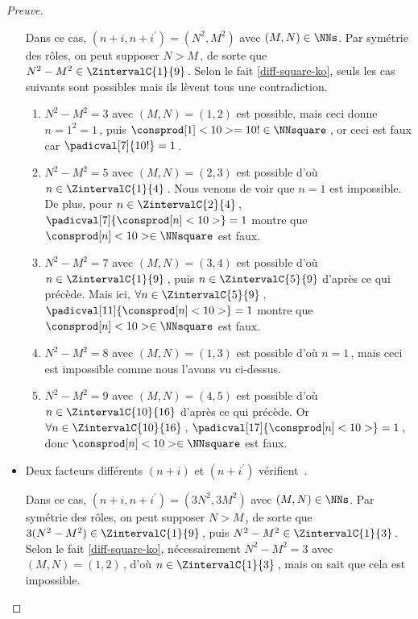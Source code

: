 \begin{proof}[Preuve]
\begin{itemize}
		\smallskip
		\noindent
		Dans ce cas, $(n+i, n+i^\prime) = (N^2, M^2)$ avec $(M, N) \in \NNs$.
		Par symétrie des rôles, on peut supposer $N > M$\,, de sorte que $N^2 - M^2 \in \ZintervalC{1}{9}$\,. 
		Selon le fait \ref{diff-square-ko}, seuls les cas suivants sont possibles mais ils lèvent tous une contradiction.
		\begin{enumerate}
			\item $N^2 - M^2 = 3$ avec $(M, N) = (1, 2)$ est possible, mais ceci donne $n = 1^2 = 1$\,, puis $\consprod[1]<10> = 10 ! \in \NNsquare$\,, or ceci est faux car $\padicval[7]{10!} = 1$\,.


			\item $N^2 - M^2 = 5$ avec $(M, N) = (2, 3)$ est possible
			d'où $n \in \ZintervalC{1}{4}$\,.
			Nous venons de voir que $n = 1$ est impossible.
			De plus, pour $n \in \ZintervalC{2}{4}$\,, $\padicval[7]{\consprod[n]<10>} = 1$ montre que $\consprod[n]<10> \in \NNsquare$ est faux.
			

			\item $N^2 - M^2 = 7$ avec $(M, N) = (3, 4)$ est possible
			d'où $n \in \ZintervalC{1}{9}$\,, puis $n \in \ZintervalC{5}{9}$ d'après ce qui précède.
			Mais ici, $\forall n \in \ZintervalC{5}{9}$\,, $\padicval[11]{\consprod[n]<10>} = 1$ montre que $\consprod[n]<10> \in \NNsquare$ est faux.


			\item $N^2 - M^2 = 8$ avec $(M, N) = (1, 3)$ est possible
			d'où $n = 1$\,, mais ceci est impossible comme nous l'avons vu ci-dessus.


			\item $N^2 - M^2 = 9$ avec $(M, N) = (4, 5)$ est possible
			d'où $n \in \ZintervalC{10}{16}$ d'après ce qui précède.
			Or $\forall n \in \ZintervalC{10}{16}$\,, $\padicval[17]{\consprod[n]<10>} = 1$\,, donc $\consprod[n]<10> \in \NNsquare$ est faux.
		\end{enumerate}


    	\medskip
		\item Deux facteurs différents $(n+i)$ et $(n+i^\prime)$ vérifient \,.
		
		\smallskip
		\noindent
		Dans ce cas, $(n+i, n+i^\prime) = (3 N^2, 3 M^2)$ avec $(M, N) \in \NNs$.
		Par symétrie des rôles, on peut supposer $N > M$\,, de sorte que $3(N^2 - M^2) \in \ZintervalC{1}{9}$\,, puis $N^2 - M^2 \in \ZintervalC{1}{3}$\,. 
		Selon le fait \ref{diff-square-ko}, nécessairement $N^2 - M^2 = 3$ avec $(M, N) = (1, 2)$\,, d'où $n \in \ZintervalC{1}{3}$\,, mais on sait que cela est impossible.



\end{itemize}
\end{proof}
